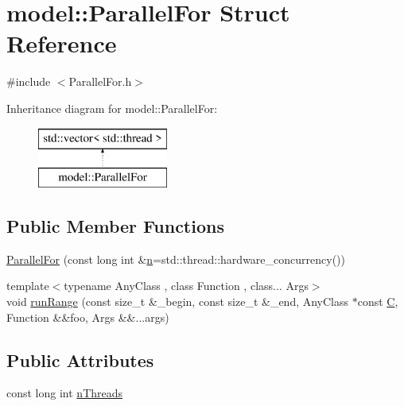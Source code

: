 \hypertarget{structmodel_1_1_parallel_for}{}\section{model\+:\+:Parallel\+For Struct Reference}
\label{structmodel_1_1_parallel_for}


{\ttfamily \#include $<$Parallel\+For.\+h$>$}

Inheritance diagram for model\+:\+:Parallel\+For\+:\begin{figure}[H]
\begin{center}
\leavevmode
\includegraphics[height=2.000000cm]{structmodel_1_1_parallel_for}
\end{center}
\end{figure}
\subsection*{Public Member Functions}
\begin{DoxyCompactItemize}
\item 
\hyperlink{structmodel_1_1_parallel_for_a12f3dc5d53b72ba3619a973c013f5800}{Parallel\+For} (const long int \&\hyperlink{_f_e_m_2linear__elasticity__3d_2tetgen_2generate_p_o_l_ycube_8m_a74637fc31d6aedd6d61cdc0c8154bc13}{n}=std\+::thread\+::hardware\+\_\+concurrency())
\item 
{\footnotesize template$<$typename Any\+Class , class Function , class... Args$>$ }\\void \hyperlink{structmodel_1_1_parallel_for_a9c1cae025a56a82e62060c4ff1661659}{run\+Range} (const size\+\_\+t \&\+\_\+begin, const size\+\_\+t \&\+\_\+end, Any\+Class $\ast$const \hyperlink{plot_cells_8m_aaa53ca0b650dfd85c4f59fa156f7a2cc}{C}, Function \&\&foo, Args \&\&...args)
\end{DoxyCompactItemize}
\subsection*{Public Attributes}
\begin{DoxyCompactItemize}
\item 
const long int \hyperlink{structmodel_1_1_parallel_for_ad949adaf7dec8df3422b1fe6c370bbdb}{n\+Threads}
\end{DoxyCompactItemize}


